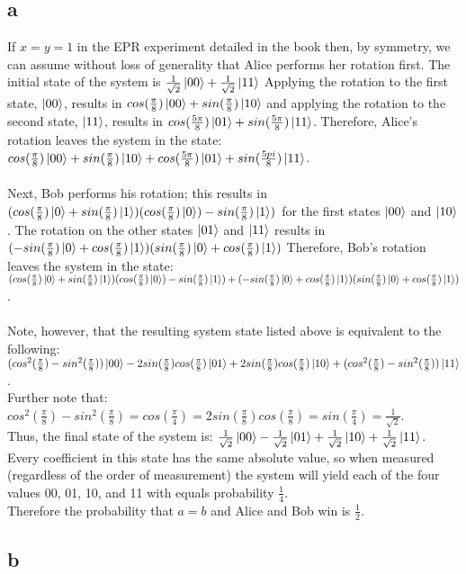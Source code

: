 \documentclass[letterpaper,notitlepage,twoside]{article}
\begin{document}
\subsection*{a}
If $x=y=1$ in the EPR experiment detailed in the book then, by symmetry, we can assume without loss of generality that Alice performs her rotation first. The initial state of the system is $\frac{1}{\sqrt{2}} \ket{00} + \frac{1}{\sqrt{2}} \ket{11}$ Applying the rotation to the first state, $\ket{00}$, results in $cos(\frac{\pi}{8}) \ket{00} + sin(\frac{\pi}{8}) \ket{10}$ and applying the rotation to the second state, $\ket{11}$, results in $cos(\frac{5\pi}{8}) \ket{01} + sin(\frac{5\pi}{8}) \ket{11}$. Therefore, Alice's rotation leaves the system in the state: $cos(\frac{\pi}{8}) \ket{00} + sin(\frac{\pi}{8}) \ket{10} + cos(\frac{5\pi}{8}) \ket{01} + sin(\frac{5pi}{8}) \ket{11}$. \\\\
Next, Bob performs his rotation; this results in $(cos(\frac{\pi}{8}) \ket{0} + sin(\frac{\pi}{8}) \ket{1})(cos(\frac{\pi}{8}) \ket{0}) - sin(\frac{\pi}{8})\ket{1})$ for the first states $\ket{00}$ and $\ket{10}$. The rotation on the other states $\ket{01}$ and $\ket{11}$ results in $(-sin(\frac{\pi}{8}) \ket{0} + cos(\frac{\pi}{8}) \ket{1})(sin(\frac{\pi}{8}) \ket{0} + cos(\frac{\pi}{8}) \ket{1})$
Therefore, Bob's rotation leaves the system in the state: \\
 $(cos(\frac{\pi}{8}) \ket{0} + sin(\frac{\pi}{8}) \ket{1})(cos(\frac{\pi}{8}) \ket{0}) - sin(\frac{\pi}{8})\ket{1}) + (-sin(\frac{\pi}{8}) \ket{0} + cos(\frac{\pi}{8}) \ket{1})(sin(\frac{\pi}{8}) \ket{0} + cos(\frac{\pi}{8}) \ket{1})$. \\\\
Note, however, that the resulting system state listed above is equivalent to the following: $(cos^{2}(\frac{\pi}{8}) - sin^{2}(\frac{\pi}{8})) \ket{00} - 2sin(\frac{\pi}{8})cos(\frac{\pi}{8}) \ket{01} + 2sin(\frac{\pi}{8})cos(\frac{\pi}{8}) \ket{10} + (cos^{2}(\frac{\pi}{8}) - sin^{2}(\frac{\pi}{8})) \ket{11}$.\\
Further note that: $cos^{2}(\frac{\pi}{8}) - sin^{2}(\frac{\pi}{8}) = cos(\frac{\pi}{4}) = 2sin(\frac{\pi}{8})cos(\frac{\pi}{8}) = sin(\frac{\pi}{4}) = \frac{1}{\sqrt{2}}$. \\
Thus, the final state of the system is: $\frac{1}{\sqrt{2}} \ket{00} - \frac{1}{\sqrt{2}} \ket{01} + \frac{1}{\sqrt{2}} \ket{10} + \frac{1}{\sqrt{2}} \ket{11}$. \\
Every coefficient in this state has the same absolute value, so when measured (regardless of the order of measurement) the system will yield each of the four values 00, 01, 10, and 11 with equals probability $\frac{1}{4}$. \\
Therefore the probability that $a=b$ and Alice and Bob win is $\frac{1}{2}$.
\subsection*{b}
\end{document}
